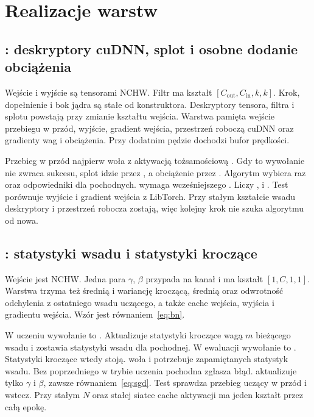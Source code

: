 \section{Realizacje warstw}

\subsection{: deskryptory cuDNN, splot i osobne dodanie obciążenia}

Wejście i wyjście są tensorami NCHW. Filtr ma kształt \([C_{\mathrm{out}}, C_{\mathrm{in}}, k, k]\). Krok, dopełnienie i bok jądra są stałe od konstruktora. Deskryptory tensora, filtra i splotu powstają przy zmianie kształtu wejścia. Warstwa pamięta wejście przebiegu w przód, wyjście, gradient wejścia, przestrzeń roboczą cuDNN oraz gradienty wag i obciążenia. Przy dodatnim pędzie dochodzi bufor prędkości.

Przebieg w przód najpierw woła  z aktywacją tożsamościową \cite{nvidia-cudnn}. Gdy to wywołanie nie zwraca sukcesu, splot idzie przez , a obciążenie przez . Algorytm wybiera raz  oraz odpowiedniki dla pochodnych.  wymaga wcześniejszego . Liczy ,  i . Test  porównuje wyjście i gradient wejścia z LibTorch. Przy stałym kształcie wsadu deskryptory i przestrzeń robocza zostają, więc kolejny krok nie szuka algorytmu od nowa.

\subsection{: statystyki wsadu i statystyki kroczące}

Wejście jest NCHW. Jedna para \(\gamma\), \(\beta\) przypada na kanał i ma kształt \([1, C, 1, 1]\). Warstwa trzyma też średnią i wariancję kroczącą, średnią oraz odwrotność odchylenia z ostatniego wsadu uczącego, a także cache wejścia, wyjścia i gradientu wejścia. Wzór jest równaniem~\eqref{eq:bn}.

W uczeniu wywołanie to . Aktualizuje statystyki kroczące wagą \(m\) bieżącego wsadu i zostawia statystyki wsadu dla pochodnej. W ewaluacji wywołanie to . Statystyki kroczące wtedy stoją.  woła  i potrzebuje zapamiętanych statystyk wsadu. Bez poprzedniego  w trybie uczenia pochodna zgłasza błąd.  aktualizuje tylko \(\gamma\) i \(\beta\), zawsze równaniem~\eqref{eq:sgd}. Test  sprawdza przebieg uczący w przód i wstecz. Przy stałym \(N\) oraz stałej siatce cache aktywacji ma jeden kształt przez całą epokę.


